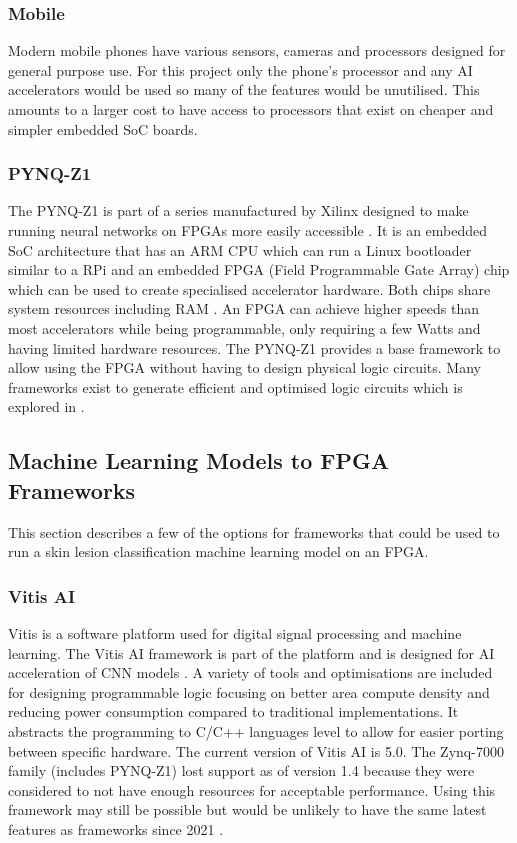 \documentclass[12pt,nonacm,acmlarge,titlepage,screen]{acmart}
\begin{document}
		\subsubsection{Mobile}
		Modern mobile phones have various sensors, cameras and processors designed for general purpose use. For this project only the phone's processor and any AI accelerators would be used so many of the features would be unutilised. This amounts to a larger cost to have access to processors that exist on cheaper and simpler embedded SoC boards.

		\subsubsection{PYNQ-Z1}
		The PYNQ-Z1 is part of a series manufactured by Xilinx designed to make running neural networks on FPGAs more easily accessible \cite{pynq_z1_man}. It is an embedded SoC architecture that has an ARM CPU which can run a Linux bootloader similar to a RPi and an embedded FPGA (Field Programmable Gate Array) chip which can be used to create specialised accelerator hardware. Both chips share system resources including RAM \cite[Section 2]{pynq_z1_man}. An FPGA can achieve higher speeds than most accelerators while being programmable, only requiring a few Watts and having limited hardware resources. The PYNQ-Z1 provides a base framework to allow using the FPGA without having to design physical logic circuits. Many frameworks exist to generate efficient and optimised logic circuits which is explored in .

	\subsection{Machine Learning Models to FPGA Frameworks} \label{lit:fpga_pipelines}
	This section describes a few of the options for frameworks that could be used to run a skin lesion classification machine learning model on an FPGA.

		\subsubsection{Vitis AI}
		Vitis is a software platform used for digital signal processing and machine learning. The Vitis AI framework is part of the platform and is designed for AI acceleration of CNN models \cite[Page 16, AI Engine Development Environment]{vitis_paper}. A variety of tools and optimisations are included for designing programmable logic focusing on better area compute density and reducing power consumption compared to traditional implementations. It abstracts the programming to C/C++ languages level to allow for easier porting between specific hardware. The current version of Vitis AI is 5.0. The Zynq-7000 family (includes PYNQ-Z1) lost support as of version 1.4 because they were considered to not have enough resources for acceptable performance. Using this framework may still be possible but would be unlikely to have the same latest features as frameworks since 2021 \cite[AMD Support Page, GitHub Vitis 1.4 Release]{vitis_1_4_support, vitis_1_4_git}.
\end{document}
